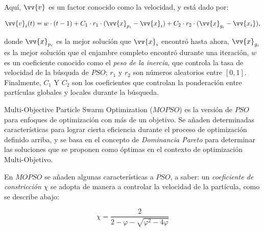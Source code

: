 Aquí, $\vv{v}$\label{symbol:mopsovelocidad} es un factor conocido como la velocidad, y está dado por:

\begin{equation}\label{eq:velocidad1}
\vv{v}_i(t) = w \cdot (t-1) + C_1 \cdot r_1 \cdot (\vv{x}_{p_i} - \vv{x}_i) + C_2 \cdot r_2 \cdot (\vv{x}_{g_i} - \vv{x_i}) \text{,}
\end{equation}

donde $\vv{x}_{p_i}$ es la mejor solución que $\vv{x}_i$ encontró hasta ahora, $\vv{x}_{g_i}$ es la mejor solución que el enjambre completo encontró durante una iteración, $w$ es un coeficiente conocido como el \textit{peso de la inercia}, que controla la tasa de velocidad de la búsquda de $PSO$; $r_1$ y $r_2$ son números aleatorios entre $[0,1]$. Finalmente, $C_1$ Y $C_2$ son los coeficientes que controlan la ponderación entre partículas globales y locales durante la búsqueda.


Multi-Objective Particle Swarm Optimization ($MOPSO$) \cite{nebro2009smpso} es la versión de $PSO$ para enfoques de optimización con más de un objetivo. Se añaden determinadas características para lograr cierta eficiencia durante el proceso de optimización definido arriba, y se basa en el concepto de \textit{Dominancia Pareto} para determinar las soluciones que se proponen como óptimas en el contexto de optimización Multi-Objetivo.

En $MOPSO$ se añaden algunas características a $PSO$, a saber: un \textit{coeficiente de constricción} $\chi$ se adopta de manera a controlar la velocidad de la partícula, como se describe abajo:

\begin{equation}
\chi = \frac{2}{2 - \varphi - \sqrt{\varphi^2 - 4 \varphi}}
\end{equation}

